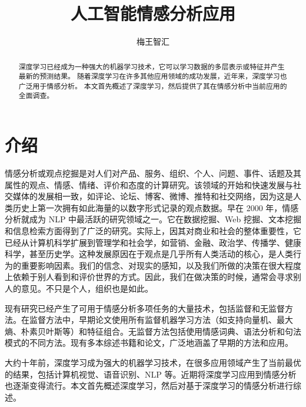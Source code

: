 \documentclass[lang=cn,11pt,a4paper]{elegantpaper}
\title{人工智能情感分析应用}
\author{梅王智汇}
\date{}
\begin{document}
\maketitle
\thispagestyle{fancy}         %
\fancyhead{}                     %
\lfoot{}
\cfoot{\thepage}  %
\rfoot{}
\renewcommand{\headrulewidth}{0pt}      %
\renewcommand{\footrulewidth}{0pt}

\begin{abstract}
深度学习已经成为一种强大的机器学习技术，它可以学习数据的多层表示或特征并产生最新的预测结果。 随着深度学习在许多其他应用领域的成功发展，近年来，深度学习也广泛用于情感分析。 本文首先概述了深度学习，然后提供了其在情感分析中当前应用的全面调查。
\end{abstract}

\section{介绍}
情感分析或观点挖掘是对人们对产品、服务、组织、个人、问题、事件、话题及其属性的观点、情感、情绪、评价和态度的计算研究\cite{1}。该领域的开始和快速发展与社交媒体的发展相一致，如评论、论坛、博客、微博、推特和社交网络，因为这是人类历史上第一次拥有如此海量的以数字形式记录的观点数据。早在 2000 年，情感分析就成为 NLP 中最活跃的研究领域之一。它在数据挖掘、Web 挖掘、文本挖掘和信息检索方面得到了广泛的研究。实际上，因其对商业和社会的整体重要性，它已经从计算机科学扩展到管理学和社会学，如营销、金融、政治学、传播学、健康科学，甚至历史学。这种发展原因在于观点是几乎所有人类活动的核心，是人类行为的重要影响因素。我们的信念、对现实的感知，以及我们所做的决策在很大程度上依赖于别人看到和评价世界的方式。因此，我们在做决策的时候，通常会寻求别人的意见。不只是个人，组织也是如此。

现有研究已经产生了可用于情感分析多项任务的大量技术，包括监督和无监督方法。在监督方法中，早期论文使用所有监督机器学习方法（如支持向量机、最大熵、朴素贝叶斯等）和特征组合。无监督方法包括使用情感词典、语法分析和句法模式的不同方法。现有多本综述书籍和论文，广泛地涵盖了早期的方法和应用\cite{2,3}。

大约十年前，深度学习成为强大的机器学习技术，在很多应用领域产生了当前最优的结果，包括计算机视觉、语音识别、NLP 等。近期将深度学习应用到情感分析也逐渐变得流行。本文首先概述深度学习，然后对基于深度学习的情感分析进行综述。
\end{document}
